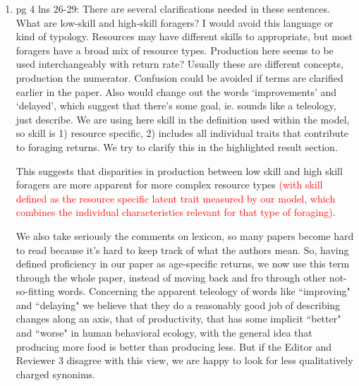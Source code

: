 \documentclass{article}
\newcommand{\rev}[1]{{\color{ForestGreen}#1}}
\begin{document}
\begin{enumerate}
    \item pg 4 lns 26-29: There are several clarifications needed in these sentences. What are low-skill and high-skill foragers? I would avoid this language or kind of typology. Resources may have different skills to appropriate, but most foragers have a broad mix of resource types. Production here seems to be used interchangeably with return rate? Usually these are different concepts, production the numerator. Confusion could be avoided if terms are clarified earlier in the paper. Also would change out the words ‘improvements’ and ‘delayed’, which suggest that there’s some goal, ie. sounds like a teleology, just describe.
    \rev{We are using here skill in the definition used within the model, so skill is 1) resource specific, 2) includes all individual traits that contribute to foraging returns. We try to clarify this in the highlighted result section. }
    \begin{displayquote}
    This suggests that disparities in production between low skill and high skill foragers are more apparent for more complex resource types \textcolor{red}{(with skill defined as the resource specific latent trait measured by our model, which combines the individual characteristics relevant for that type of foraging)}. 
    \end{displayquote}
    \rev{We also take seriously the comments on lexicon, so many papers become hard to read because it's hard to keep track of what the authors mean. So, having defined proficiency in our paper as age-specific returns, we now use this term through the whole paper, instead of moving back and fro through other not-so-fitting words. Concerning the apparent teleology of words like ``improving" and ``delaying" we believe that they do a reasonably good job of describing changes along an axis, that of productivity, that has some implicit ``better" and ``worse" in human behavioral ecology, with the general idea that producing more food is better than producing less. But if the Editor and Reviewer 3 disagree with this view, we are happy to look for less qualitatively charged synonims. }
    

\end{enumerate}
\end{document}
